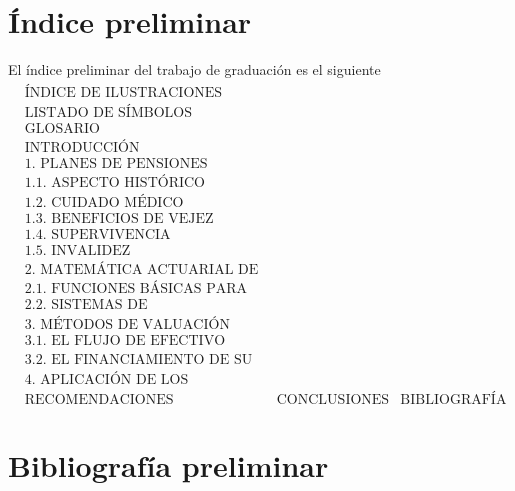 \documentclass[12pt,letterpaper,titlepage]{article}
\begin{document}
\section{Índice preliminar}
El índice preliminar del trabajo de graduación es el siguiente
\begin{align*}
&\text{ÍNDICE DE ILUSTRACIONES}\\
&\text{LISTADO DE SÍMBOLOS}\\
&\text{GLOSARIO}\\
&\text{INTRODUCCIÓN}\\
&\text{1. PLANES DE PENSIONES}\\
&\text{1.1. ASPECTO HISTÓRICO }\\
&\text{1.2. CUIDADO MÉDICO }\\
&\text{1.3. BENEFICIOS DE VEJEZ}\\
&\text{1.4. SUPERVIVENCIA}\\
&\text{1.5. INVALIDEZ }\\
&\text{2. MATEMÁTICA ACTUARIAL DE LOS PLANES DE PENSIONES}\\
&\text{2.1. FUNCIONES BÁSICAS PARA EL FINANCIAMIENTO DE LOS PLANES DE PENSIONES}\\
&\text{2.2. SISTEMAS DE FINANCIAMIENTO DE LOS PLANES DE PENSIONES}\\
&\text{3. MÉTODOS DE VALUACIÓN}\\
&\text{3.1. EL FLUJO DE EFECTIVO}\\
&\text{3.2. EL FINANCIAMIENTO DE SU RESERVA MATEMÁTICA }\\
&\text{4. APLICACIÓN DE LOS MÉTODOS DE VALUACIÓN EN LOS PLANES DE PENSIONES}\\
&\text{RECOMENDACIONES}
&\text{CONCLUSIONES}
&\text{BIBLIOGRAFÍA} %
\end{align*}

\newpage

\section{Bibliografía preliminar}


\label{fin}
\end{document}
